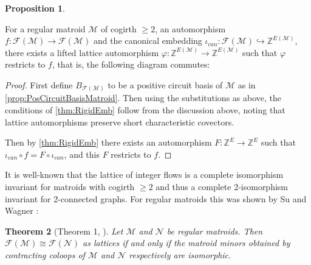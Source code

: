 \documentclass[12pt]{report}
\newtheorem{theorem}{Theorem}[chapter]
\theoremstyle{definition}
\newtheorem{proposition}[theorem]{Proposition}
\def\Z{\mathbb Z}
\def\calF{\mathcal F}
\def\calM{\mathcal M}
\def\calN{\mathcal N}
\theoremstyle{upright}
\begin{document}
\begin{proposition}\label{prop:StrongAuto}

    For a regular matroid $\calM$ of cogirth $\geq2$, an automorphism $f:\calF(\calM)\to\calF(\calM)$ and the canonical embedding $\iota_{can}:\calF(\calM)\hookrightarrow\Z^{E(\calM)}$, there exists a lifted lattice automorphism $\varphi:\Z^{E(\calM)}\to\Z^{E(\calM)}$ such that $\varphi$ restricts to $f$, that is, the following diagram commutes:

    \begin{center}
    
        
    \end{center}
    
\end{proposition}

\begin{proof}

    First define $B_{\calF(\calM)}$ to be a positive circuit basis of $\calM$ as in \cref{prop:PosCircuitBasisMatroid}. Then using the substitutions as above, the conditions of \cref{thm:RigidEmb} follow from the discussion above, noting that lattice automorphisms preserve short characteristic covectors.

    Then by \cref{thm:RigidEmb} there exists an automorphism $F:\Z^E\to\Z^E$ such that $\iota_{can}\circ f=F\circ\iota_{can}$, and this $F$ restricts to $f$.
    
\end{proof}

It is well-known that the lattice of integer flows is a complete isomorphism invariant for matroids with cogirth $\geq2$ and thus a complete 2-isomorphism invariant for 2-connected graphs.
For regular matroids this was shown by Su and Wagner \cite{su2010lattice}:

\begin{theorem}[Theorem 1, \cite{su2010lattice}]

    Let $\calM$ and $\calN$ be regular matroids.
    Then $\calF(\calM)\cong\calF(\calN)$ as lattices if and only if the matroid minors obtained by contracting coloops of $\calM$ and $\calN$ respectively are isomorphic.
    
\end{theorem}
\end{document}
